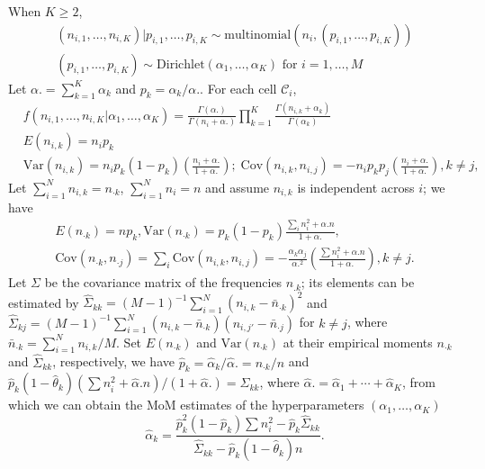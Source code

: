 \documentclass[10pt,journal,compsoc]{IEEEtran}
\newcommand{\C}{\mathcal{C}}
\begin{document}
When $K\geq2$,
\begin{align*}
(n_{i,1},\dots,n_{i,K})|p_{i,1},\dots,p_{i,K}\sim\mbox{multinomial}(n_i,(p_{i,1},\dots,p_{i,K}))\\
(p_{i,1},\dots,p_{i,K})\sim\mbox{Dirichlet}(\alpha_1,\dots,\alpha_K)\mbox{ for }i=1,\dots,M
\end{align*}
Let $\alpha.=\sum_{k=1}^K\alpha_k$ and $p_k=\alpha_k/\alpha.$. For each cell $\C_i$, 
\begin{align*}
&f(n_{i,1},\dots,n_{i,K}|\alpha_1,\dots,\alpha_K)=\frac{\Gamma(\alpha.)}{\Gamma(n_i+\alpha.)}\prod_{k=1}^K\frac{\Gamma(n_{i,k}+\alpha_k)}{\Gamma(\alpha_k)}\\
&E(n_{i,k})=n_ip_k\\
&\mbox{Var}(n_{i,k})=n_ip_k(1-p_k)\left(\frac{n_i+\alpha.}{1+\alpha.}\right);\;
\mbox{Cov}(n_{i,k},n_{i,j})=-n_ip_kp_j\left(\frac{n_i+\alpha.}{1+\alpha.}\right),k\neq j,
\end{align*}
Let $\sum_{i=1}^N n_{i,k}=n_{\cdot k}$, $\sum_{i=1}^N n_i=n$ and assume $n_{i,k}$ is independent across $i$; we have
\begin{align*}
E(n_{\cdot k})=np_k, 
\mbox{Var}(n_{\cdot k})=p_k(1-p_k)\frac{\sum_in_i^2+\alpha.n}{1+\alpha.},\\
\mbox{Cov}(n_{\cdot k},n_{\cdot j})=\sum_i\mbox{Cov}(n_{i,k},n_{i,j})=-\frac{\alpha_k\alpha_j}{\alpha.^2}\left(\frac{\sum n_i^2+\alpha. n}{1+\alpha.}\right),k\neq j.
\end{align*}
Let $\Sigma$ be the covariance matrix of the frequencies $n_{.k}$; its elements can be estimated by
$\hat{\Sigma}_{kk}=(M-1)^{-1}\sum_{i=1}^N(n_{i,k}-\bar{n}_{\cdot k})^2$ and $\hat{\Sigma}_{kj}=(M-1)^{-1}\sum_{i=1}^N(n_{i,k}-\bar{n}_{\cdot k})(n_{i,j'}-\bar{n}_{\cdot j})$ for $k\ne j$,
where $\bar{n}_{\cdot k}=\sum_{i=1}^N n_{i,k}/M$. Set $E(n_{\cdot k})$ and $\mbox{Var}(n_{\cdot k})$ at their empirical moments $n_{\cdot k}$ and  $\hat{\Sigma}_{kk}$, respectively, we have $\hat{p}_k=\hat{\alpha}_k/\hat{\alpha}.= n_{\cdot k}/n$ and 
$\hat{p}_k\left(1-\hat{\theta}_k\right)(\sum n_i^2+\hat{\alpha}. n)/(1+\hat{\alpha}.)=\hat{\Sigma}_{kk}$, where $\hat{\alpha}.=\hat{\alpha}_1+\cdots+\hat{\alpha}_K$, from which we can obtain the MoM estimates of the hyperparameters $(\alpha_1,\dots,\alpha_K)$ 
$$\hat{\alpha}_k=\frac{\hat{p}_k^2(1-\hat{p}_k)\sum n_i^2-\hat{p}_k\hat{\Sigma}_{kk}}{\hat{\Sigma}_{kk}-\hat{p}_k(1-\hat{\theta}_k)n}.$$
\end{document}
